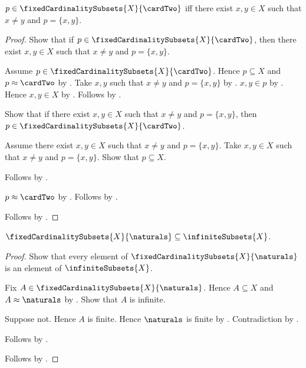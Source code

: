 \begin{proposition}\label{two_subset_characterization}
    $p\in\fixedCardinalitySubsets{X}{\cardTwo}$ iff
        there exist $x,y\in X$ such that $x\neq y$ and $p=\{x,y\}$.
\end{proposition}
\begin{proof}
    Show that if $p\in\fixedCardinalitySubsets{X}{\cardTwo}$, then
        there exist $x,y\in X$ such that $x\neq y$ and $p=\{x,y\}$.
    \begin{subproof}
        Assume $p\in\fixedCardinalitySubsets{X}{\cardTwo}$.
        Hence $p\subseteq X$ and $p\approx\cardTwo$ by
            .
        Take $x,y$ such that $x\neq y$ and $p=\{x,y\}$ by
            .
        $x,y\in p$ by .
        Hence $x,y\in X$ by .
        Follows by \auto.
    \end{subproof}
    Show that if there exist $x,y\in X$ such that $x\neq y$ and
            $p=\{x,y\}$, then
        $p\in\fixedCardinalitySubsets{X}{\cardTwo}$.
    \begin{subproof}
        Assume there exist $x,y\in X$ such that $x\neq y$ and
            $p=\{x,y\}$.
        Take $x,y\in X$ such that $x\neq y$ and $p=\{x,y\}$.
        Show that $p\subseteq X$.
        \begin{subproof}
            Follows by .
        \end{subproof}
        $p\approx\cardTwo$ by
            .
        Follows by .
    \end{subproof}
    Follows by \auto.
\end{proof}

\begin{proposition}\label{countably_infinite_subsets_are_infinite}
    $\fixedCardinalitySubsets{X}{\naturals}
        \subseteq\infiniteSubsets{X}$.
\end{proposition}
\begin{proof}
    Show that every element of $\fixedCardinalitySubsets{X}{\naturals}$ is
        an element of $\infiniteSubsets{X}$.
    \begin{subproof}
        Fix $A\in\fixedCardinalitySubsets{X}{\naturals}$.
        Hence $A\subseteq X$ and $A\approx\naturals$ by
            .
        Show that $A$ is infinite.
        \begin{subproof}
            Suppose not.
            Hence $A$ is finite.
            Hence $\naturals$ is finite by .
            Contradiction by .
        \end{subproof}
        Follows by .
    \end{subproof}
    Follows by .
\end{proof}

